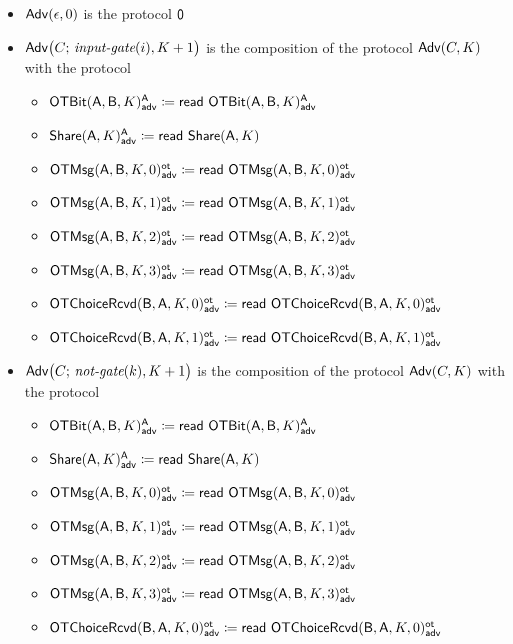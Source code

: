 \begin{itemize}
\item $\Adv(\epsilon,0)$ is the protocol $\zero$
\item $\Adv\big(C; \, \inputgate(i),K+1\big)$ is the composition of the protocol $\Adv(C,K)$ with the protocol
\begin{itemize}
\item {\color{blue} $\LeakOTBit(\A,\B,K)^\A_\adv \coloneqq \read{\LeakOTBit(\A,\B,K)^\A_\adv}$}
\item {\color{blue} $\LeakShare(\A,K)^\A_\adv \coloneqq \read{\Share(\A,K)}$}\medskip
\item {\color{blue} $\LeakOTMsg(\A,\B,K,0)^\ot_\adv \coloneqq \read{\LeakOTMsg(\A,\B,K,0)^\ot_\adv}$}
\item {\color{blue} $\LeakOTMsg(\A,\B,K,1)^\ot_\adv \coloneqq \read{\LeakOTMsg(\A,\B,K,1)^\ot_\adv}$}
\item {\color{blue} $\LeakOTMsg(\A,\B,K,2)^\ot_\adv \coloneqq \read{\LeakOTMsg(\A,\B,K,2)^\ot_\adv}$}
\item {\color{blue} $\LeakOTMsg(\A,\B,K,3)^\ot_\adv \coloneqq \read{\LeakOTMsg(\A,\B,K,3)^\ot_\adv}$}\medskip
\item {\color{blue} $\LeakOTChoiceRcvd(\B,\A,K,0)^\ot_\adv \coloneqq \read{\LeakOTChoiceRcvd(\B,\A,K,0)^\ot_\adv}$}
\item {\color{blue} $\LeakOTChoiceRcvd(\B,\A,K,1)^\ot_\adv \coloneqq \read{\LeakOTChoiceRcvd(\B,\A,K,1)^\ot_\adv}$}
\end{itemize}
\item $\Adv\big(C; \, \notgate(k),K+1\big)$ is the composition of the protocol $\Adv(C,K)$ with the protocol
\begin{itemize}
\item {\color{blue} $\LeakOTBit(\A,\B,K)^\A_\adv \coloneqq \read{\LeakOTBit(\A,\B,K)^\A_\adv}$}
\item {\color{blue} $\LeakShare(\A,K)^\A_\adv \coloneqq \read{\Share(\A,K)}$}\medskip
\item {\color{blue} $\LeakOTMsg(\A,\B,K,0)^\ot_\adv \coloneqq \read{\LeakOTMsg(\A,\B,K,0)^\ot_\adv}$}
\item {\color{blue} $\LeakOTMsg(\A,\B,K,1)^\ot_\adv \coloneqq \read{\LeakOTMsg(\A,\B,K,1)^\ot_\adv}$}
\item {\color{blue} $\LeakOTMsg(\A,\B,K,2)^\ot_\adv \coloneqq \read{\LeakOTMsg(\A,\B,K,2)^\ot_\adv}$}
\item {\color{blue} $\LeakOTMsg(\A,\B,K,3)^\ot_\adv \coloneqq \read{\LeakOTMsg(\A,\B,K,3)^\ot_\adv}$}\medskip
\item {\color{blue} $\LeakOTChoiceRcvd(\B,\A,K,0)^\ot_\adv \coloneqq \read{\LeakOTChoiceRcvd(\B,\A,K,0)^\ot_\adv}$}

\end{itemize}
\end{itemize}
